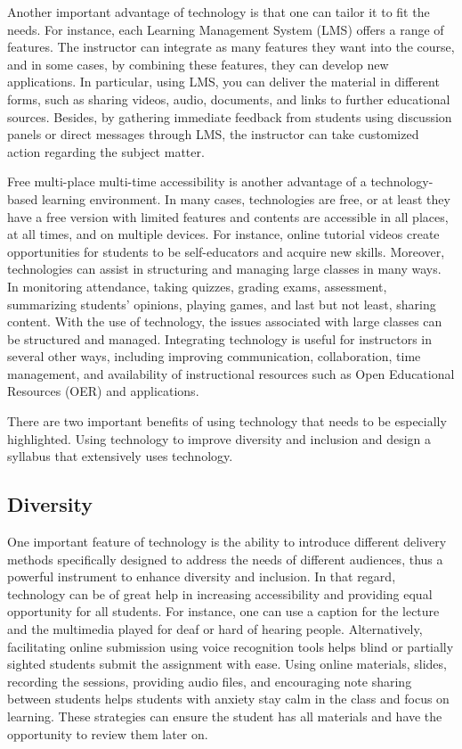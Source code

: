 \documentclass{book}
\begin{document}
Another important advantage of technology is that one can tailor it to fit the
needs. For instance, each Learning Management System (LMS) offers a range of
features. The instructor can integrate as many features they want into the
course, and in some cases, by combining these features, they can develop new
applications. In particular, using LMS, you can deliver the material in
different forms, such as sharing videos, audio, documents, and links to
further educational sources. Besides, by gathering immediate feedback from
students using discussion panels or direct messages through LMS, the
instructor can take customized action regarding the subject matter.

Free multi-place multi-time accessibility is another advantage of a
technology-based learning environment. In many cases, technologies are free,
or at least they have a free version with limited features and contents are
accessible in all places, at all times, and on multiple devices. For instance,
online tutorial videos create opportunities for students to be self-educators
and acquire new skills. Moreover, technologies can assist in structuring and
managing large classes in many ways. In monitoring attendance, taking quizzes,
grading exams, assessment, summarizing students' opinions, playing games, and
last but not least, sharing content. With the use of technology, the issues
associated with large classes can be structured and managed. Integrating
technology is useful for instructors in several other ways, including
improving communication, collaboration, time management, and availability of
instructional resources such as Open Educational Resources (OER) and
applications.

There are two important benefits of using technology that needs to be
especially highlighted. Using technology to improve diversity and inclusion
and design a syllabus that extensively uses technology.

\hypertarget{diversity-1}{%
\subsection{Diversity}\label{diversity-1}}

One important feature of technology is the ability to introduce different
delivery methods specifically designed to address the needs of different
audiences, thus a powerful instrument to enhance diversity and inclusion. In
that regard, technology can be of great help in increasing accessibility and
providing equal opportunity for all students. For instance, one can use a
caption for the lecture and the multimedia played for deaf or hard of hearing
people. Alternatively, facilitating online submission using voice recognition
tools helps blind or partially sighted students submit the assignment with
ease. Using online materials, slides, recording the sessions, providing audio
files, and encouraging note sharing between students helps students with
anxiety stay calm in the class and focus on learning. These strategies can
ensure the student has all materials and have the opportunity to review them
later on.
\end{document}
